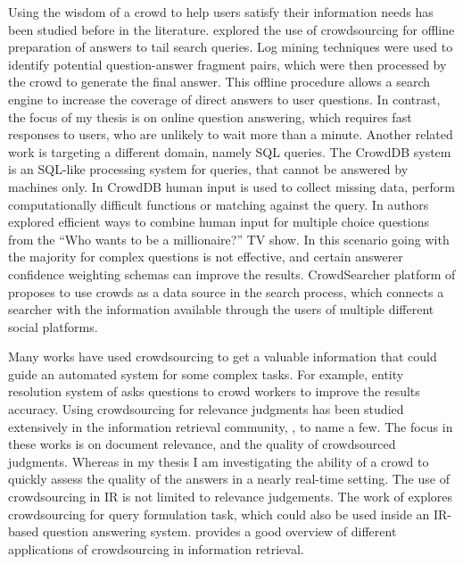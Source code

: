 Using the wisdom of a crowd to help users satisfy their information needs has been studied before in the literature.
\cite{bernstein2012direct} explored the use of crowdsourcing for offline preparation of answers to tail search queries.
Log mining techniques were used to identify potential question-answer fragment pairs, which were then processed by the crowd to generate the final answer.
This offline procedure allows a search engine to increase the coverage of direct answers to user questions.
In contrast, the focus of my thesis is on online question answering, which requires fast responses to users, who are unlikely to wait more than a minute.
Another related work is targeting a different domain, namely SQL queries.
The CrowdDB system~\cite{franklin2011crowddb} is an SQL-like processing system for queries, that cannot be answered by machines only.
In CrowdDB human input is used to collect missing data, perform computationally difficult functions or matching against the query.
In \cite{aydin2014crowdsourcing} authors explored efficient ways to combine human input for multiple choice questions from the ``Who wants to be a millionaire?'' TV show.
In this scenario going with the majority for complex questions is not effective, and certain answerer confidence weighting schemas can improve the results.  
CrowdSearcher platform of \cite{Bozzon:2012:ASQ:2187836.2187971} proposes to use crowds as a data source in the search process, which connects a searcher with the information available through the users of multiple different social platforms.

Many works have used crowdsourcing to get a valuable information that could guide an automated system for some complex tasks.
For example, entity resolution system of \cite{Whang:2013:QSC:2536336.2536337} asks questions to crowd workers to improve the results accuracy.
Using crowdsourcing for relevance judgments has been studied extensively in the information retrieval community, \eg, \cite{Alonso:2008:CRE:1480506.1480508,alonso2011design,grady2010crowdsourcing} to name a few.
The focus in these works is on document relevance, and the quality of crowdsourced judgments.
Whereas in my thesis I am investigating the ability of a crowd to quickly assess the quality of the answers in a nearly real-time setting.
The use of crowdsourcing in IR is not limited to relevance judgements.
The work of \cite{harris2013comparing} explores crowdsourcing for query formulation task, which could also be used inside an IR-based question answering system.
\cite{lease2013crowdsourcing} provides a good overview of different applications of crowdsourcing in information retrieval.

